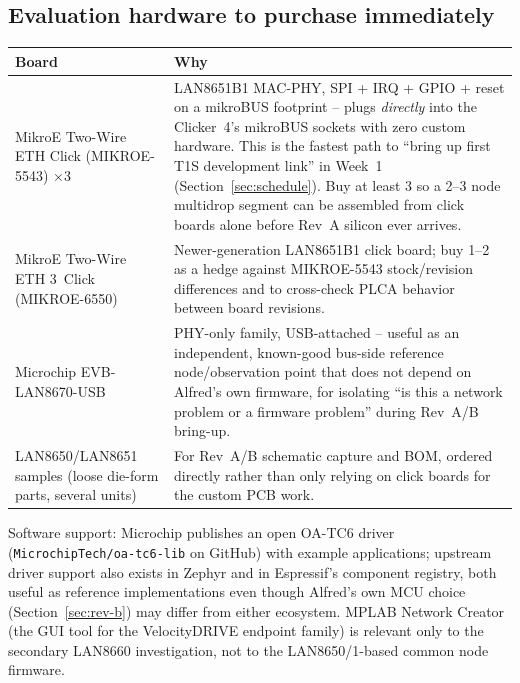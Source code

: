 \subsection{Evaluation hardware to purchase immediately}

\begin{center}
\small
\begin{tabularx}{\linewidth}{@{}p{3.6cm} X@{}}
\toprule
\textbf{Board} & \textbf{Why} \\
\midrule
MikroE Two-Wire ETH Click (MIKROE-5543) $\times$3 & LAN8651B1 MAC-PHY, SPI + IRQ + GPIO + reset on a mikroBUS footprint -- plugs \emph{directly} into the Clicker~4's mikroBUS sockets with zero custom hardware. This is the fastest path to ``bring up first T1S development link'' in Week~1 (Section~\ref{sec:schedule}). Buy at least 3 so a 2--3 node multidrop segment can be assembled from click boards alone before Rev~A silicon ever arrives. \\
MikroE Two-Wire ETH 3~Click (MIKROE-6550) & Newer-generation LAN8651B1 click board; buy 1--2 as a hedge against MIKROE-5543 stock/revision differences and to cross-check PLCA behavior between board revisions. \\
Microchip EVB-LAN8670-USB & PHY-only family, USB-attached -- useful as an independent, known-good bus-side reference node/observation point that does not depend on Alfred's own firmware, for isolating ``is this a network problem or a firmware problem'' during Rev~A/B bring-up. \\
LAN8650/LAN8651 samples (loose die-form parts, several units) & For Rev~A/B schematic capture and BOM, ordered directly rather than only relying on click boards for the custom PCB work. \\
\bottomrule
\end{tabularx}
\end{center}

Software support: Microchip publishes an open OA-TC6 driver (\texttt{MicrochipTech/oa-tc6-lib} on GitHub) with example applications; upstream driver support also exists in Zephyr and in Espressif's component registry, both useful as reference implementations even though Alfred's own MCU choice (Section~\ref{sec:rev-b}) may differ from either ecosystem. MPLAB Network Creator (the GUI tool for the VelocityDRIVE endpoint family) is relevant only to the secondary LAN8660 investigation, not to the LAN8650/1-based common node firmware.
